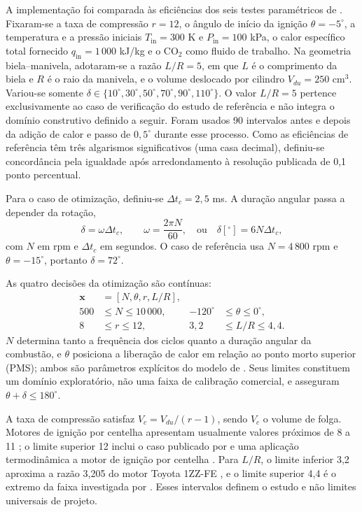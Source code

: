 \documentclass[a4paper,11pt]{article}
\begin{document}
A implementação foi comparada às eficiências dos seis testes paramétricos de
\citet{naaktgeboren2017}. Fixaram-se a taxa de compressão $r=12$, o ângulo de
início da ignição $\theta=-5^\circ$, a temperatura e a pressão iniciais
$T_{\mathrm{in}}=300$ K e $P_{\mathrm{in}}=100$ kPa, o calor específico total
fornecido $q_{\mathrm{in}}=1\,000$ kJ/kg e o CO$_2$ como fluido de trabalho. Na
geometria biela--manivela, adotaram-se a razão $L/R=5$, em que $L$ é o
comprimento da biela e $R$ é o raio da manivela, e o volume deslocado por
cilindro $V_{du}=250$ cm$^3$. Variou-se somente
$\delta\in\{10^\circ,30^\circ,50^\circ,70^\circ,90^\circ,110^\circ\}$.
O valor $L/R=5$ pertence exclusivamente ao caso de verificação do estudo de
referência e não integra o domínio construtivo definido a seguir.
Foram usados 90 intervalos antes e depois da adição de calor e passo de
$0{,}5^\circ$ durante esse processo. Como as eficiências de referência têm três
algarismos significativos (uma casa decimal), definiu-se concordância pela
igualdade após arredondamento à resolução publicada de 0,1 ponto percentual.

Para o caso de otimização, definiu-se $\Delta t_c=2{,}5$ ms. A duração angular
passa a depender da rotação,
\begin{equation}
\delta=\omega\Delta t_c,\qquad
\omega=\frac{2\pi N}{60},
\quad\text{ou}\quad
\delta[^\circ]=6N\Delta t_c,
\label{eq:duracao-angular}
\end{equation}
com $N$ em rpm e $\Delta t_c$ em segundos. O caso de referência usa
$N=4\,800$ rpm e $\theta=-15^\circ$, portanto $\delta=72^\circ$.

As quatro decisões da otimização são contínuas:
\begin{equation}
\begin{aligned}
\mathbf{x}&=[N,\theta,r,L/R],\\
500&\leq N\leq10\,000, & -120^\circ&\leq\theta\leq0^\circ,\\
8&\leq r\leq12, & 3{,}2&\leq L/R\leq4{,}4.
\end{aligned}
\label{eq:variaveis-decisao}
\end{equation}
$N$ determina tanto a frequência dos ciclos quanto a duração angular da
combustão, e $\theta$ posiciona a liberação de calor em relação ao ponto morto
superior (PMS); ambos
são parâmetros explícitos do modelo de \citet{naaktgeboren2017}. Seus limites
constituem um domínio exploratório, não uma faixa de calibração comercial, e
asseguram $\theta+\delta\leq180^\circ$.

A taxa de compressão satisfaz $V_c=V_{du}/(r-1)$, sendo $V_c$ o volume de
folga. Motores de ignição por centelha apresentam usualmente valores próximos
de 8 a 11 \citep{pulkrabek2004}; o limite superior 12 inclui o caso publicado
por \citet{naaktgeboren2017} e uma aplicação termodinâmica a motor de ignição
por centelha \citep{shah2022producer}. Para $L/R$, o limite inferior 3,2
aproxima a razão 3,205 do motor Toyota 1ZZ-FE \citep{adachi1998toyota}, e o
limite superior 4,4 é o extremo da faixa investigada por
\citet{shah2022producer}. Esses intervalos definem o estudo e não limites
universais de projeto.
\end{document}
